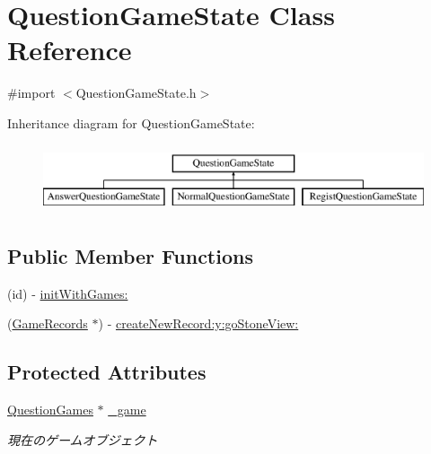 \hypertarget{interface_question_game_state}{
\section{QuestionGameState Class Reference}
\label{interface_question_game_state}
}


{\ttfamily \#import $<$QuestionGameState.h$>$}

Inheritance diagram for QuestionGameState:\begin{figure}[H]
\begin{center}
\leavevmode
\includegraphics[height=2.000000cm]{interface_question_game_state}
\end{center}
\end{figure}
\subsection*{Public Member Functions}
\begin{DoxyCompactItemize}
\item 
(id) -\/ \hyperlink{interface_question_game_state_a2694ab39f75d3a8d9847ce3d1efb8629}{initWithGames:}
\item 
(\hyperlink{interface_game_records}{GameRecords} $\ast$) -\/ \hyperlink{interface_question_game_state_a1fea34013604cbfd6985631c4edb10cc}{createNewRecord:y:goStoneView:}
\end{DoxyCompactItemize}
\subsection*{Protected Attributes}
\begin{DoxyCompactItemize}
\item 
\hypertarget{interface_question_game_state_a14d128e56dd2e072271b4636c5063049}{
\hyperlink{interface_question_games}{QuestionGames} $\ast$ \hyperlink{interface_question_game_state_a14d128e56dd2e072271b4636c5063049}{\_\-game}}
\label{interface_question_game_state_a14d128e56dd2e072271b4636c5063049}

\begin{DoxyCompactList}\small\item\em 現在のゲームオブジェクト \end{DoxyCompactList}\end{DoxyCompactItemize}



